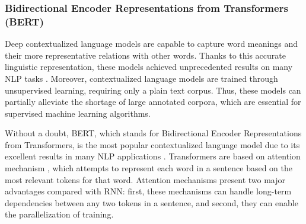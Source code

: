 \documentclass[preprint,12pt]{elsarticle}
\begin{document}
 
\subsubsection{Bidirectional Encoder Representations from Transformers (BERT)}

Deep contextualized language models are capable to capture  word meanings and their more representative relations with other words. Thanks to this accurate linguistic representation, these models achieved unprecedented results on many NLP tasks \cite{devlin-etal-2019-bert}. 
 Moreover, contextualized language models are trained through unsupervised learning, requiring only a plain text corpus. Thus, these models can partially alleviate the shortage of large annotated corpora, which are essential for supervised machine learning algorithms. 

Without a doubt, BERT, which stands for Bidirectional Encoder Representations from Transformers, is the most popular contextualized language model due to its excellent results in many NLP applications \cite{devlin-etal-2019-bert}. Transformers are based on attention mechanism \cite{vaswani2017attention}, which attempts to represent each word in a sentence based on the most relevant tokens for that word. Attention mechanisms present two major advantages compared with RNN: first, these mechanisms can handle long-term dependencies between any two tokens in a sentence, and second, they can enable the parallelization of training.
\end{document}
